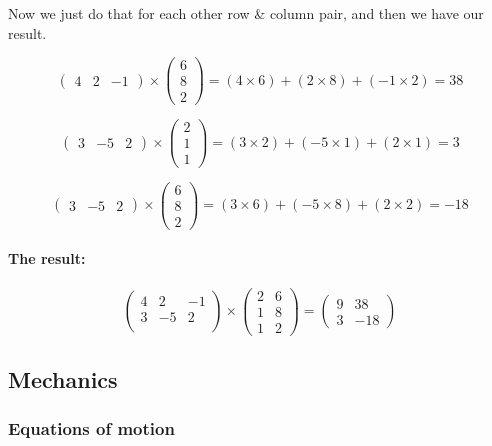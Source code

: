 Now we just do that for each other row \& column pair, and then we have our result.

\[\begin{pmatrix}4&2&-1\end{pmatrix}\times
\begin{pmatrix}6\\8\\2\end{pmatrix}=
(4\times6)+(2\times8)+(-1\times2)=38\]

\[\begin{pmatrix}3&-5&2\end{pmatrix}\times
\begin{pmatrix}2\\1\\1\end{pmatrix}=
(3\times2)+(-5\times1)+(2\times1)=3\]

\[\begin{pmatrix}3&-5&2\end{pmatrix}\times\begin{pmatrix}6\\8\\2\end{pmatrix}=(3\times6)+(-5\times8)+(2\times2)=-18\]

\hypertarget{the-result}{%
\paragraph{The result:}\label{the-result}}

\[\begin{pmatrix}4&2&-1\\3&-5&2\\\end{pmatrix}\times
\begin{pmatrix}2&6\\1&8\\1&2\end{pmatrix}=\begin{pmatrix}9&38\\3&-18\end{pmatrix}\]

\hypertarget{mechanics}{%
\subsection{Mechanics}\label{mechanics}}

\hypertarget{equations-of-motion}{%
\subsubsection{Equations of motion}\label{equations-of-motion}}

